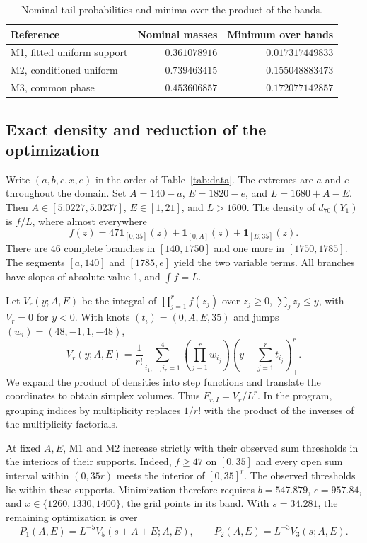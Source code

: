 \documentclass[11pt,a4paper]{article}
\newcommand{\ind}{\mathbf{1}}
\begin{document}
\begin{table}[htbp]
\centering
\caption{Nominal tail probabilities and minima over the product of the bands.}
\label{tab:results}
\begin{tabular}{lrr}
\toprule
Reference & Nominal masses & Minimum over bands\\
\midrule
M1, fitted uniform support & $0.361078916$ & $0.017317449833$\\
M2, conditioned uniform & $0.739463415$ & $0.155048883473$\\
M3, common phase & $0.453606857$ & $0.172077142857$\\
\bottomrule
\end{tabular}
\end{table}

\subsection{Exact density and reduction of the optimization}

Write $(a,b,c,x,e)$ in the order of Table~\ref{tab:data}. The extremes are $a$ and $e$ throughout the domain. Set $A=140-a$, $E=1820-e$, and $L=1680+A-E$. Then $A\in[5.0227,5.0237]$, $E\in[1,21]$, and $L>1600$. The density of $d_{70}(Y_1)$ is $f/L$, where almost everywhere
\[
f(z)=47\ind_{[0,35]}(z)+\ind_{[0,A]}(z)+\ind_{[E,35]}(z).
\]
There are 46 complete branches in $[140,1750]$ and one more in $[1750,1785]$. The segments $[a,140]$ and $[1785,e]$ yield the two variable terms. All branches have slopes of absolute value 1, and $\int f=L$.

Let $V_r(y;A,E)$ be the integral of $\prod_{j=1}^r f(z_j)$ over $z_j\geq0$, $\sum_j z_j\leq y$, with $V_r=0$ for $y<0$. With knots $(t_i)=(0,A,E,35)$ and jumps $(w_i)=(48,-1,1,-48)$,
\begin{equation}\label{eq:vol}
V_r(y;A,E)=\frac1{r!}\sum_{i_1,\ldots,i_r=1}^4
\left(\prod_{j=1}^r w_{i_j}\right)
\left(y-\sum_{j=1}^r t_{i_j}\right)_+^r.
\end{equation}
We expand the product of densities into step functions and translate the coordinates to obtain simplex volumes. Thus $F_{r,I}=V_r/L^r$. In the program, grouping indices by multiplicity replaces $1/r!$ with the product of the inverses of the multiplicity factorials.

At fixed $A,E$, M1 and M2 increase strictly with their observed sum thresholds in the interiors of their supports. Indeed, $f\geq47$ on $[0,35]$ and every open sum interval within $(0,35r)$ meets the interior of $[0,35]^r$. The observed thresholds lie within these supports. Minimization therefore requires $b=547.879$, $c=957.84$, and $x\in\{1260,1330,1400\}$, the grid points in its band. With $s=34.281$, the remaining optimization is over
\[
P_1(A,E)=L^{-5}V_5(s+A+E;A,E),\qquad
P_2(A,E)=L^{-3}V_3(s;A,E).
\]
\end{document}
